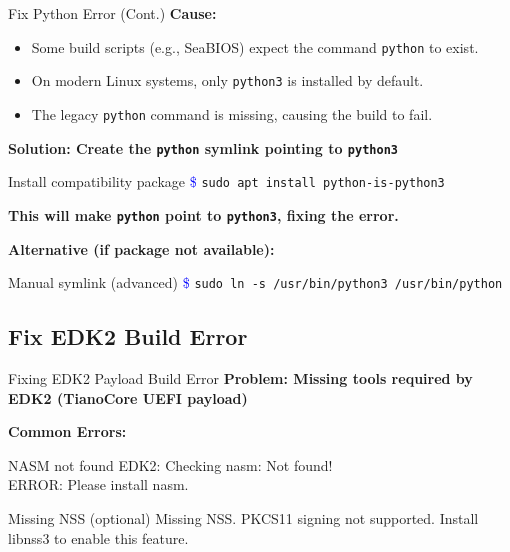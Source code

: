 \documentclass{beamer}
\begin{document}
	
	

	\begin{frame}{Fix Python Error (Cont.)}
		\textbf{Cause:}
		\begin{itemize}
			\item Some build scripts (e.g., SeaBIOS) expect the command \texttt{python} to exist.
			\item On modern Linux systems, only \texttt{python3} is installed by default.
			\item The legacy \texttt{python} command is missing, causing the build to fail.
		\end{itemize}
		
		\vspace{0.4cm}
		\textbf{Solution: Create the \texttt{python} symlink pointing to \texttt{python3}}
		
		\begin{exampleblock}{Install compatibility package}
			\textcolor{blue}{\$} \texttt{sudo apt install python-is-python3}
		\end{exampleblock}
		
		\textbf{This will make \texttt{python} point to \texttt{python3}, fixing the error.}
		
		\vspace{0.4cm}
		\textbf{Alternative (if package not available):}
		\begin{exampleblock}{Manual symlink (advanced)}
			\textcolor{blue}{\$} \texttt{sudo ln -s /usr/bin/python3 /usr/bin/python}
		\end{exampleblock}
	\end{frame}
	
	
	
	
	
	
	
	\subsection{Fix EDK2 Build Error}
	\begin{frame}{Fixing EDK2 Payload Build Error}
		\textbf{Problem: Missing tools required by EDK2 (TianoCore UEFI payload)}
		
		\textbf{Common Errors:}
		\begin{exampleblock}{NASM not found}
			EDK2: Checking nasm:        Not found! \\
			ERROR: Please install nasm.
		\end{exampleblock}
		
		\begin{exampleblock}{Missing NSS (optional)}
			Missing NSS. PKCS11 signing not supported. Install libnss3 to enable this feature.
		\end{exampleblock}
	\end{frame}
	
\end{document}
